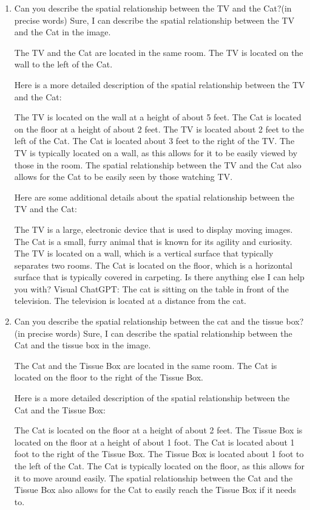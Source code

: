 \begin{enumerate}
    \item Can you describe the spatial relationship between the TV and the Cat?(in precise words)
    \subitem 
    Sure, I can describe the spatial relationship between the TV and the Cat in the image.
    
    The TV and the Cat are located in the same room. The TV is located on the wall to the left of the Cat.
    
    Here is a more detailed description of the spatial relationship between the TV and the Cat:
    
    The TV is located on the wall at a height of about 5 feet.
    The Cat is located on the floor at a height of about 2 feet.
    The TV is located about 2 feet to the left of the Cat.
    The Cat is located about 3 feet to the right of the TV.
    The TV is typically located on a wall, as this allows for it to be easily viewed by those in the room. The spatial relationship between the TV and the Cat also allows for the Cat to be easily seen by those watching TV.
    
    Here are some additional details about the spatial relationship between the TV and the Cat:
    
    The TV is a large, electronic device that is used to display moving images.
    The Cat is a small, furry animal that is known for its agility and curiosity.
    The TV is located on a wall, which is a vertical surface that typically separates two rooms.
    The Cat is located on the floor, which is a horizontal surface that is typically covered in carpeting.
    Is there anything else I can help you with?
    \subitem Visual ChatGPT: The cat is sitting on the table in front of the television. The television is located at a distance from the cat.
    \item Can you describe the spatial relationship between the cat and the tissue box?(in precise words)
    \subitem Sure, I can describe the spatial relationship between the Cat and the tissue box in the image.

    The Cat and the Tissue Box are located in the same room. The Cat is located on the floor to the right of the Tissue Box.
    
    Here is a more detailed description of the spatial relationship between the Cat and the Tissue Box:
    
    The Cat is located on the floor at a height of about 2 feet.
    The Tissue Box is located on the floor at a height of about 1 foot.
    The Cat is located about 1 foot to the right of the Tissue Box.
    The Tissue Box is located about 1 foot to the left of the Cat.
    The Cat is typically located on the floor, as this allows for it to move around easily. The spatial relationship between the Cat and the Tissue Box also allows for the Cat to easily reach the Tissue Box if it needs to.
    

\end{enumerate}
